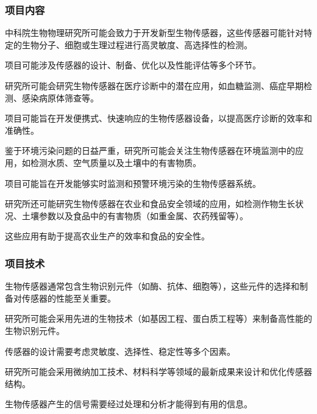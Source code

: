 \subsubsection{项目内容}


中科院生物物理研究所可能会致力于开发新型生物传感器，这些传感器可能针对特定的生物分子、细胞或生理过程进行高灵敏度、高选择性的检测。

项目可能涉及传感器的设计、制备、优化以及性能评估等多个环节。


研究所可能会研究生物传感器在医疗诊断中的潜在应用，如血糖监测、癌症早期检测、感染病原体筛查等。

项目可能旨在开发便携式、快速响应的生物传感器设备，以提高医疗诊断的效率和准确性。


鉴于环境污染问题的日益严重，研究所可能会关注生物传感器在环境监测中的应用，如检测水质、空气质量以及土壤中的有害物质。

项目可能旨在开发能够实时监测和预警环境污染的生物传感器系统。


研究所还可能研究生物传感器在农业和食品安全领域的应用，如检测作物生长状况、土壤参数以及食品中的有害物质（如重金属、农药残留等）。

这些应用有助于提高农业生产的效率和食品的安全性。

\subsubsection{项目技术}


生物传感器通常包含生物识别元件（如酶、抗体、细胞等），这些元件的选择和制备对传感器的性能至关重要。

研究所可能会采用先进的生物技术（如基因工程、蛋白质工程等）来制备高性能的生物识别元件。


传感器的设计需要考虑灵敏度、选择性、稳定性等多个因素。

研究所可能会采用微纳加工技术、材料科学等领域的最新成果来设计和优化传感器结构。


生物传感器产生的信号需要经过处理和分析才能得到有用的信息。

